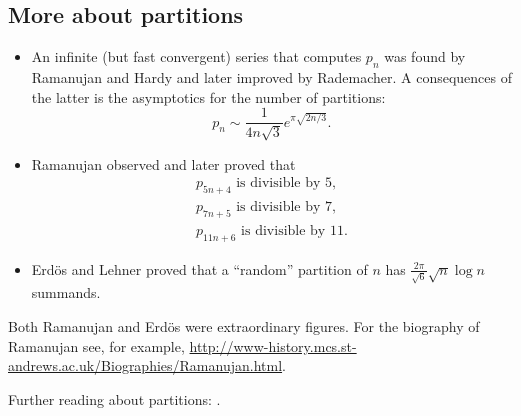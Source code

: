 \subsection{More about partitions}
\begin{itemize}
\item 
An infinite (but fast convergent) series that computes $p_n$ was found by Ramanujan and Hardy and later improved by Rademacher.
A consequences of the latter is the asymptotics for the number of partitions:
\[
p_n \sim \frac{1}{4n\sqrt{3}} e^{\pi\sqrt{2n/3}}.
\]
\item
Ramanujan observed and later proved that
\begin{gather*}
p_{5n+4} \text{ is divisible by } 5,\\
p_{7n+5} \text{ is divisible by } 7,\\
p_{11n+6} \text{ is divisible by } 11.
\end{gather*}
\item
Erd\"os and Lehner proved that a ``random'' partition of $n$ has $\frac{2\pi}{\sqrt{6}} \sqrt{n} \log n$ summands.
\end{itemize}

Both Ramanujan and Erd\"os were extraordinary figures.
For the biography of Ramanujan see, for example,
\url{http://www-history.mcs.st-andrews.ac.uk/Biographies/Ramanujan.html}.

Further reading about partitions: \cite{AE04}.


\newpage
